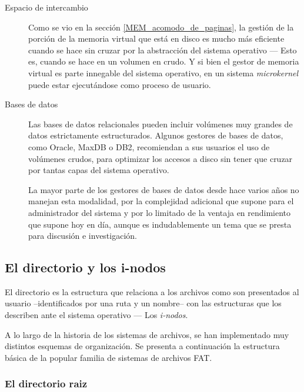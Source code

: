 \documentclass[11pt,fleqn]{book} %
\begin{document}
\begin{description}
\item[Espacio de intercambio] Como se vio en la sección \ref{MEM_acomodo_de_paginas}, la
     gestión de la porción de la memoria virtual que está en disco es
     mucho más eficiente cuando se hace sin cruzar por la abstracción
     del sistema operativo — Esto es, cuando se hace en un volumen en
     crudo. Y si bien el gestor de memoria virtual es parte innegable
     del sistema operativo, en un sistema \emph{microkernel} puede estar
     ejecutándose como proceso de usuario.
\item[Bases de datos] Las bases de datos relacionales pueden incluir
                    volúmenes muy grandes de datos estrictamente
                    estructurados. Algunos gestores de bases de
                    datos, como Oracle, MaxDB o DB2, recomiendan a
                    sus usuarios el uso de volúmenes crudos, para
                    optimizar los accesos a disco sin tener que cruzar
                    por tantas capas del sistema operativo.

		    La mayor parte de los gestores de bases de datos
                    desde hace varios años no manejan esta modalidad,
                    por la complejidad adicional que
                    supone para el administrador del sistema y por lo
                    limitado de la ventaja en rendimiento que supone
                    hoy en día, aunque es indudablemente un tema que
                    se presta para discusión e investigación.
\end{description}
\subsection{El directorio y los i-nodos}
\label{sec-7-1-4}
\label{FS_el_directorio}


El directorio es la estructura que relaciona a los archivos como son
presentados al usuario –identificados por una ruta y un nombre– con
las estructuras que los describen ante el sistema operativo — Los
\emph{i-nodos}.

A lo largo de la historia de los sistemas de archivos, se han
implementado muy distintos esquemas de organización. Se presenta a
continuación la estructura básica de la popular familia de sistemas de
archivos FAT.
\subsubsection{El directorio raiz}
\label{sec-7-1-4-1}
\end{document}
